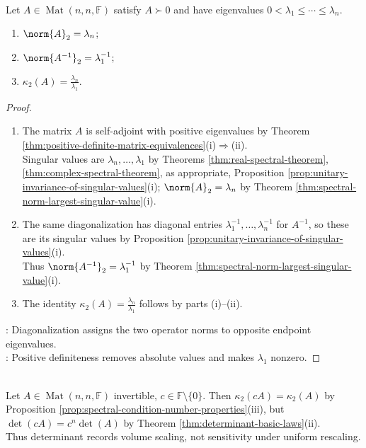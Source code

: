 \begin{corollary} \label{cor:positive-definite-condition-number-eigenvalues} \\
Let $A\in\operatorname{Mat}(n,n,\mathbb{F})$ satisfy $A\succ0$ and have eigenvalues $0<\lambda_1\leq\cdots\leq\lambda_n$.
\begin{enumerate}[label=(\roman*)]
\setlength{\itemsep}{0pt}
\item $\norm{A}_2=\lambda_n$;
\item $\norm{A^{-1}}_2=\lambda_1^{-1}$;
\item $\kappa_2(A)=\frac{\lambda_n}{\lambda_1}$.
\end{enumerate}
\begin{proof}
\begin{enumerate}[label=(\roman*)]
\setlength{\itemsep}{0pt}
\item[$(i)$] The matrix $A$ is self-adjoint with positive eigenvalues by Theorem \ref{thm:positive-definite-matrix-equivalences}(i)$\Rightarrow$(ii).\\
Singular values are $\lambda_n,\ldots,\lambda_1$ by Theorems \ref{thm:real-spectral-theorem}, \ref{thm:complex-spectral-theorem}, as appropriate, Proposition \ref{prop:unitary-invariance-of-singular-values}(i); $\norm{A}_2=\lambda_n$ by Theorem \ref{thm:spectral-norm-largest-singular-value}(i).
\item[$(ii)$] The same diagonalization has diagonal entries $\lambda_1^{-1},\ldots,\lambda_n^{-1}$ for $A^{-1}$, so these are its singular values by Proposition \ref{prop:unitary-invariance-of-singular-values}(i).\\
Thus $\norm{A^{-1}}_2=\lambda_1^{-1}$ by Theorem \ref{thm:spectral-norm-largest-singular-value}(i).
\item[$(iii)$] The identity $\kappa_2(A)=\frac{\lambda_n}{\lambda_1}$ follows by parts (i)--(ii).
\end{enumerate}
: Diagonalization assigns the two operator norms to opposite endpoint eigenvalues.\\
: Positive definiteness removes absolute values and makes $\lambda_1$ nonzero.
\end{proof}
\end{corollary}

\begin{perspective} \label{per:determinant-is-not-conditioning} \\
Let $A\in\operatorname{Mat}(n,n,\mathbb{F})$ invertible, $c\in\mathbb{F}\setminus\{0\}$. Then $\kappa_2(cA)=\kappa_2(A)$ by Proposition \ref{prop:spectral-condition-number-properties}(iii), but $\det(cA)=c^n\det(A)$ by Theorem \ref{thm:determinant-basic-laws}(ii).\\
Thus determinant records volume scaling, not sensitivity under uniform rescaling.
\end{perspective}

